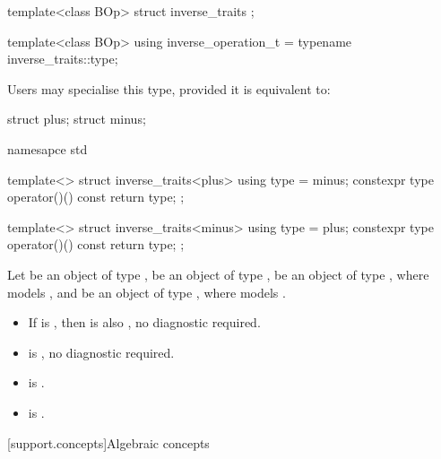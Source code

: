 \begin{itemdecl}
  template<class BOp>
  struct inverse_traits {};

  template<class BOp>
  using inverse_operation_t = typename inverse_traits::type;
\end{itemdecl}
\begin{itemdescr}
   \pnum
   Users may specialise this type, provided it is equivalent to:
   \begin{codeblock}
struct plus;
struct minus;

namesapce std {
  template<>
  struct inverse_traits<plus> {
     using type = minus;
     constexpr type operator()() const { return type{}; }
  };

  template<>
  struct inverse_traits<minus> {
     using type = plus;
     constexpr type operator()() const { return type{}; }
  };
}
   \end{codeblock}

   \pnum
   Let  be an object of type ,  be an object of type ,
    be an object of type , where  models , and
    be an object of type , where  models .

   \pnum
   \mandates
      \begin{itemize}
         \item If  is , then
                is also , no diagnostic
               required.
         \item {} is , no diagnostic required.
      \end{itemize}
   \pnum
   \expects
      \begin{itemize}
         \item {} is .
         \item {} is .
      \end{itemize}
\end{itemdescr}


[support.concepts]{Algebraic concepts}

